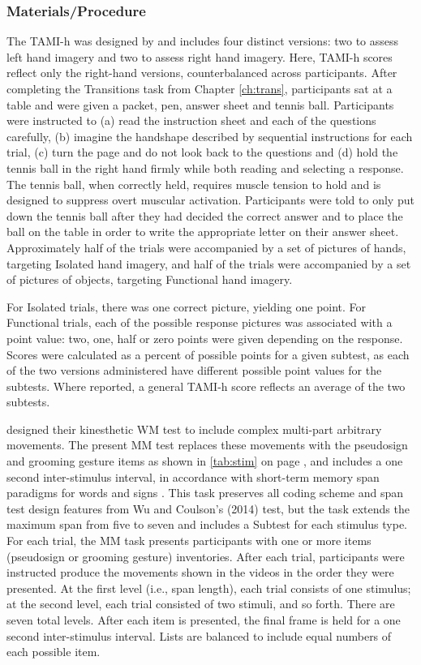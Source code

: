         \subsubsection{Materials/Procedure}
            The TAMI-h was designed by  and includes four distinct versions: two to assess left hand imagery and two to assess right hand imagery. Here, TAMI-h scores reflect only the right-hand versions, counterbalanced across participants. After completing the Transitions task from Chapter \ref{ch:trans}, participants sat at a table and were given a packet, pen, answer sheet and tennis ball. Participants were instructed to (a) read the instruction sheet and each of the questions carefully, (b) imagine the handshape described by sequential instructions for each trial, (c) turn the page and do not look back to the questions and (d) hold the tennis ball in the right hand firmly while both reading and selecting a response. The tennis ball, when correctly held, requires muscle tension to hold and is designed to suppress overt muscular activation. Participants were told to only put down the tennis ball after they had decided the correct answer and to place the ball on the table in order to write the appropriate letter on their answer sheet. Approximately half of the trials were accompanied by a set of pictures of hands, targeting Isolated hand imagery, and half of the trials were accompanied by a set of pictures of objects, targeting Functional hand imagery. \par
            For Isolated trials, there was one correct picture, yielding one point. For Functional trials, each of the possible response pictures was associated with a point value: two, one, half or zero points were given depending on the response. Scores were calculated as a percent of possible points for a given subtest, as each of the two versions administered have different possible point values for the subtests. Where reported, a general TAMI-h score reflects an average of the two subtests. \par
             designed their kinesthetic WM test to include complex multi-part arbitrary movements. The present MM test replaces these movements with the pseudosign and grooming gesture items as shown in \ref{tab:stim} on page \pageref{tab:stim}, and includes a one second inter-stimulus interval, in accordance with short-term memory span paradigms for words and signs \cite{hall2011}. This task preserves all coding scheme and span test design features from Wu and Coulson’s (2014) test, but the task extends the maximum span from five to seven and includes a Subtest for each stimulus type. For each trial, the MM task presents participants with one or more items (pseudosign or grooming gesture) inventories. After each trial, participants were instructed produce the movements shown in the videos in the order they were presented. At the first level (i.e., span length), each trial consists of one stimulus; at the second level, each trial consisted of two stimuli, and so forth. There are seven total levels. After each item is presented, the final frame is held for a one second inter-stimulus interval. Lists are balanced to include equal numbers of each possible item. \par
